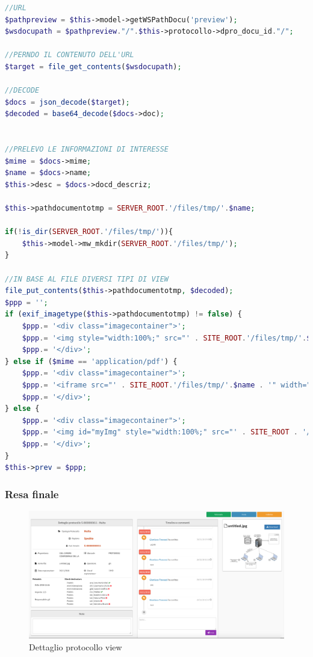         \begin{lstlisting}[language=PHP, caption=Pint della preview del documento]
//URL
$pathpreview = $this->model->getWSPathDocu('preview');
$wsdocupath = $pathpreview."/".$this->protocollo->dpro_docu_id."/";
    
//PERNDO IL CONTENUTO DELL'URL
$target = file_get_contents($wsdocupath);
    
//DECODE
$docs = json_decode($target);
$decoded = base64_decode($docs->doc);
    
    
//PRELEVO LE INFORMAZIONI DI INTERESSE
$mime = $docs->mime;
$name = $docs->name;
$this->desc = $docs->docd_descriz;
    
$this->pathdocumentotmp = SERVER_ROOT.'/files/tmp/'.$name;
    
if(!is_dir(SERVER_ROOT.'/files/tmp/')){
    $this->model->mw_mkdir(SERVER_ROOT.'/files/tmp/');
}
    
//IN BASE AL FILE DIVERSI TIPI DI VIEW
file_put_contents($this->pathdocumentotmp, $decoded);
$ppp = '';
if (exif_imagetype($this->pathdocumentotmp) != false) {
    $ppp.= '<div class="imagecontainer">';
    $ppp.= '<img style="width:100%;" src="' . SITE_ROOT.'/files/tmp/'.$name . '" >';
    $ppp.= '</div>';
} else if ($mime == 'application/pdf') {
    $ppp.= '<div class="imagecontainer">';
    $ppp.= '<iframe src="' . SITE_ROOT.'/files/tmp/'.$name . '" width="100%" height="600" ></iframe>';
    $ppp.= '</div>';
} else {
    $ppp.= '<div class="imagecontainer">';
    $ppp.= '<img id="myImg" style="width:100%;" src="' . SITE_ROOT . '/files/img/PNA.png" >';
    $ppp.= '</div>';
}
$this->prev = $ppp;
        \end{lstlisting}
    
    \subsubsection{Resa finale}
        \begin{figure}[!h] 
            \centering 
            \includegraphics[width=\textwidth]{immagini/prodottofinito/dettproto.png}
            \caption{Dettaglio protocollo view}
        \end{figure}
       
